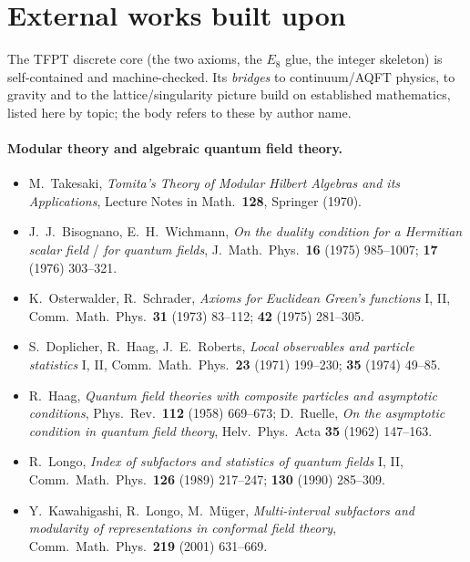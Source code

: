 \section*{External works built upon}
\small
\noindent
The TFPT discrete core (the two axioms, the $E_8$ glue, the integer skeleton) is
self-contained and machine-checked. Its \emph{bridges} to continuum/AQFT physics, to
gravity and to the lattice/singularity picture build on established mathematics, listed
here by topic; the body refers to these by author name.

\paragraph{Modular theory and algebraic quantum field theory.}
\begin{itemize}\setlength\itemsep{1.5pt}
\item M.~Takesaki, \textit{Tomita's Theory of Modular Hilbert Algebras and its
  Applications}, Lecture Notes in Math.\ \textbf{128}, Springer (1970).
\item J.~J.~Bisognano, E.~H.~Wichmann, \textit{On the duality condition for a Hermitian
  scalar field} / \textit{for quantum fields}, J.~Math.\ Phys.\ \textbf{16} (1975)
  985--1007; \textbf{17} (1976) 303--321.
\item K.~Osterwalder, R.~Schrader, \textit{Axioms for Euclidean Green's functions} I, II,
  Comm.\ Math.\ Phys.\ \textbf{31} (1973) 83--112; \textbf{42} (1975) 281--305.
\item S.~Doplicher, R.~Haag, J.~E.~Roberts, \textit{Local observables and particle
  statistics} I, II, Comm.\ Math.\ Phys.\ \textbf{23} (1971) 199--230; \textbf{35} (1974)
  49--85.
\item R.~Haag, \textit{Quantum field theories with composite particles and asymptotic
  conditions}, Phys.\ Rev.\ \textbf{112} (1958) 669--673; D.~Ruelle, \textit{On the
  asymptotic condition in quantum field theory}, Helv.\ Phys.\ Acta \textbf{35} (1962)
  147--163.
\item R.~Longo, \textit{Index of subfactors and statistics of quantum fields} I, II, Comm.\
  Math.\ Phys.\ \textbf{126} (1989) 217--247; \textbf{130} (1990) 285--309.
\item Y.~Kawahigashi, R.~Longo, M.~M\"uger, \textit{Multi-interval subfactors and modularity
  of representations in conformal field theory}, Comm.\ Math.\ Phys.\ \textbf{219} (2001)
  631--669.
\end{itemize}

